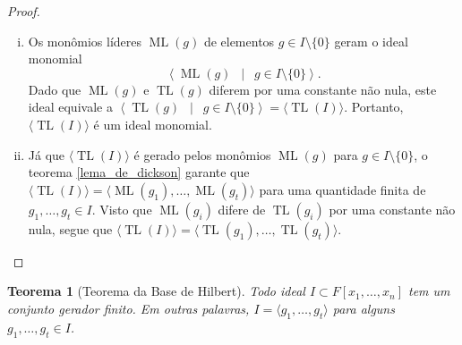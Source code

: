 \documentclass[12pt,a4paper]{report}
\newcommand{\suchthat}{\enspace\middle|\enspace}
\newtheorem{theorem}{Teorema}
\numberwithin{theorem}{chapter}
\DeclareMathOperator{\ML}{ML}
\DeclareMathOperator{\TL}{TL}
\begin{document}
\begin{proof}\mbox{}
  \begin{enumerate}[(i)]
  \item Os monômios líderes \(\ML(g)\) de elementos \(g \in I
    \setminus \{0\}\) geram o ideal monomial \[\left\langle \ML(g)
      \suchthat g \in I \setminus \{0\} \right\rangle.\] Dado que
    \(\ML(g)\) e \(\TL(g)\) diferem por uma constante não nula, este
    ideal equivale a \(\left\langle \TL(g) \suchthat g \in I \setminus
      \{0\}\right\rangle = \langle \TL(I) \rangle\).  Portanto,
    \(\langle \TL(I) \rangle\) é um ideal monomial.

  \item Já que \(\langle \TL(I) \rangle\) é gerado pelos monômios
    \(\ML(g)\) para \(g \in I\setminus\{0\}\), o teorema
    \ref{lema_de_dickson} garante que \(\langle \TL(I) \rangle =
    \langle \ML(g_1),\ldots,\ML(g_t)\rangle\) para uma quantidade
    finita de \(g_1,\ldots,g_t \in I\).  Visto que \(\ML(g_i)\) difere
    de \(\TL(g_i)\) por uma constante não nula, segue que \(\langle
    \TL(I) \rangle = \langle \TL(g_1),\ldots,\TL(g_t) \rangle\).
  \end{enumerate}
\end{proof}

\begin{theorem}[Teorema da Base de Hilbert]\label{teo_base_hilbert}
  Todo ideal \(I \subset F[x_1,\ldots,x_n]\) tem um conjunto gerador
  finito.  Em outras palavras, \(I = \langle g_1,\ldots,g_t \rangle\)
  para alguns \(g_1,\ldots,g_t \in I\).
\end{theorem}
\end{document}
